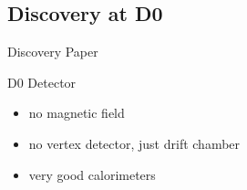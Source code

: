 \subsection{Discovery at D0}
\begin{frame}{Discovery Paper}
	
	
\end{frame}
\begin{frame}{D0 Detector}
	
	
	\begin{itemize}\itemfill
		\item no magnetic field
		\item no vertex detector, just drift chamber
		\item very good calorimeters
	\end{itemize}

	
\end{frame}